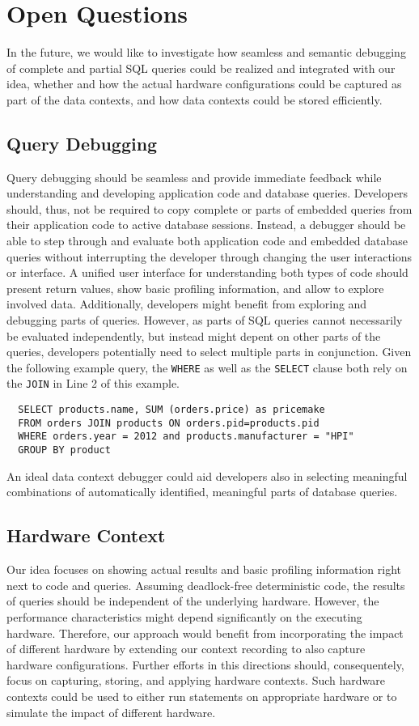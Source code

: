 \section{Open Questions} \label{sec:OPEN_QUESTIONS}
In the future, we would like to investigate how seamless and semantic debugging of complete and partial SQL queries could be realized and integrated with our idea, whether and how the actual hardware configurations could be captured as part of the data contexts, and how data contexts could be stored efficiently.

\subsection{Query Debugging}
Query debugging should be seamless and provide immediate feedback while understanding and developing application code and database queries.
Developers should, thus, not be required to copy complete or parts of embedded queries from their application code to active database sessions.
Instead, a debugger should be able to step through and evaluate both application code and embedded database queries without interrupting the developer through changing the user interactions or interface.
A unified user interface for understanding both types of code should present return values, show basic profiling information, and allow to explore involved data.
Additionally, developers might benefit from exploring and debugging parts of queries.
However, as parts of SQL queries cannot necessarily be evaluated independently, but instead might depent on other parts of the queries, developers potentially need to select multiple parts in conjunction.
Given the following example query, the \texttt{WHERE} as well as the \texttt{SELECT} clause both rely on the \texttt{JOIN} in Line 2 of this example.
\lstset{language=SQL}
\begin{lstlisting}
  SELECT products.name, SUM (orders.price) as pricemake
  FROM orders JOIN products ON orders.pid=products.pid
  WHERE orders.year = 2012 and products.manufacturer = "HPI"
  GROUP BY product
\end{lstlisting}
An ideal data context debugger could aid developers also in selecting meaningful combinations of automatically identified, meaningful parts of database queries.

\subsection{Hardware Context}
Our idea focuses on showing actual results and basic profiling information right next to code and queries.
Assuming deadlock-free deterministic code, the results of queries should be independent of the underlying hardware.
However, the performance characteristics might depend significantly on the executing hardware.
Therefore, our approach would benefit from incorporating the impact of different hardware by extending our context recording to also capture hardware configurations.
Further efforts in this directions should, consequentely, focus on capturing, storing, and applying hardware contexts.
Such hardware contexts could be used to either run statements on appropriate hardware or to simulate the impact of different hardware.

